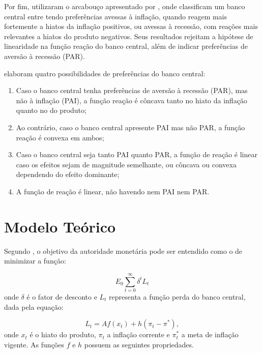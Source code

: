 \documentclass[
	article,			%
	11pt,				%
	oneside,			%
	a4paper,			%
	english,			%
	brazil,				%
	]{abntex2}
\begin{document}
	Por fim,  utilizaram o arcabouço apresentado por , onde classificam um banco central entre tendo preferências avessas à inflação, quando reagem mais fortemente a hiatos da inflação positivos, ou avessas à recessão, com reações mais relevantes a hiatos do produto negativos. Seus resultados rejeitam a hipótese de linearidade na função reação do banco central, além de indicar preferências de aversão à recessão (PAR).
	
	 elaboram quatro possibilidades de preferências do banco central:
	
	\begin{enumerate}
		\item Caso o banco central tenha preferências de aversão à recessão (PAR), mas não à inflação (PAI), a função reação é côncava tanto no hiato da inflação quanto no do produto;
		\item Ao contrário, caso o banco central apresente PAI mas não PAR, a função reação é convexa em ambos;
		\item Caso o banco central seja tanto PAI quanto PAR, a função de reação é linear caso os efeitos sejam de magnitude semelhante, ou côncava ou convexa dependendo do efeito dominante;
		\item A função de reação é linear, não havendo nem PAI nem PAR.
	\end{enumerate}
	
	\section{Modelo Teórico}
	
	Segundo , o objetivo da autoridade monetária pode ser entendido como o de minimizar a função:
	
	\begin{equation}  \label{funcao_perda}
		E_0\sum_{t=0}^{\infty}\delta^t L_t
	\end{equation}
	onde $\delta$ é o fator de desconto e $L_{t}$ representa a função perda do banco central, dada pela equação:
	
	\begin{equation} \label{funcao_perda_aberta}
		L_t = Af(x_t) + h(\pi_t - \pi^*),
	\end{equation}
	onde $x_t$ é o hiato do produto, $\pi_t$ a inflação corrente e $\pi_t^*$ a meta de inflação vigente. As funções $f$ e $h$ possuem as seguintes propriedades.
	
\end{document}
